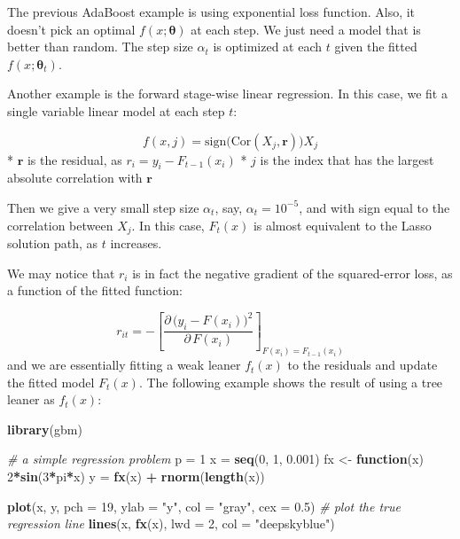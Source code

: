 \documentclass[
]{book}
\newenvironment{Shaded}{\begin{snugshade}}{\end{snugshade}}
\newcommand{\AttributeTok}[1]{\textcolor[rgb]{0.13,0.29,0.53}{#1}}
\newcommand{\CommentTok}[1]{\textcolor[rgb]{0.56,0.35,0.01}{\textit{#1}}}
\newcommand{\ControlFlowTok}[1]{\textcolor[rgb]{0.13,0.29,0.53}{\textbf{#1}}}
\newcommand{\DecValTok}[1]{\textcolor[rgb]{0.00,0.00,0.81}{#1}}
\newcommand{\FloatTok}[1]{\textcolor[rgb]{0.00,0.00,0.81}{#1}}
\newcommand{\FunctionTok}[1]{\textcolor[rgb]{0.13,0.29,0.53}{\textbf{#1}}}
\newcommand{\NormalTok}[1]{#1}
\newcommand{\OtherTok}[1]{\textcolor[rgb]{0.56,0.35,0.01}{#1}}
\newcommand{\SpecialCharTok}[1]{\textcolor[rgb]{0.81,0.36,0.00}{\textbf{#1}}}
\newcommand{\StringTok}[1]{\textcolor[rgb]{0.31,0.60,0.02}{#1}}
\theoremstyle{definition}
\theoremstyle{definition}
\theoremstyle{definition}
\theoremstyle{definition}
\theoremstyle{remark}
\begin{document}
The previous AdaBoost example is using exponential loss function. Also, it doesn't pick an optimal \(f(x; \boldsymbol \theta)\) at each step. We just need a model that is better than random. The step size \(\alpha_t\) is optimized at each \(t\) given the fitted \(f(x; \boldsymbol \theta_t)\).

Another example is the forward stage-wise linear regression. In this case, we fit a single variable linear model at each step \(t\):

\[f(x, j) = \text{sign}\big(\text{Cor}(X_j, \mathbf{r})\big) X_j\]
* \(\mathbf{r}\) is the residual, as \(r_i = y_i - F_{t-1}(x_i)\)
* \(j\) is the index that has the largest absolute correlation with \(\mathbf{r}\)

Then we give a very small step size \(\alpha_t\), say, \(\alpha_t = 10^{-5}\), and with sign equal to the correlation between \(X_j\). In this case, \(F_t(x)\) is almost equivalent to the Lasso solution path, as \(t\) increases.

We may notice that \(r_i\) is in fact the negative gradient of the squared-error loss, as a function of the fitted function:

\[r_{it} = - \left[ \frac{\partial \, \big(y_i - F(x_i)\big)^2 }{\partial \, F(x_i)} \right]_{F(x_i) = F_{t-1}(x_i)}\]
and we are essentially fitting a weak leaner \(f_t(x)\) to the residuals and update the fitted model \(F_t(x)\). The following example shows the result of using a tree leaner as \(f_t(x)\):

\begin{Shaded}
\begin{Highlighting}[]
  \FunctionTok{library}\NormalTok{(gbm)}

  \CommentTok{\# a simple regression problem}
\NormalTok{  p }\OtherTok{=} \DecValTok{1}
\NormalTok{  x }\OtherTok{=} \FunctionTok{seq}\NormalTok{(}\DecValTok{0}\NormalTok{, }\DecValTok{1}\NormalTok{, }\FloatTok{0.001}\NormalTok{)}
\NormalTok{  fx }\OtherTok{\textless{}{-}} \ControlFlowTok{function}\NormalTok{(x) }\DecValTok{2}\SpecialCharTok{*}\FunctionTok{sin}\NormalTok{(}\DecValTok{3}\SpecialCharTok{*}\NormalTok{pi}\SpecialCharTok{*}\NormalTok{x)}
\NormalTok{  y }\OtherTok{=} \FunctionTok{fx}\NormalTok{(x) }\SpecialCharTok{+} \FunctionTok{rnorm}\NormalTok{(}\FunctionTok{length}\NormalTok{(x))}

  \FunctionTok{plot}\NormalTok{(x, y, }\AttributeTok{pch =} \DecValTok{19}\NormalTok{, }\AttributeTok{ylab =} \StringTok{"y"}\NormalTok{, }\AttributeTok{col =} \StringTok{"gray"}\NormalTok{, }\AttributeTok{cex =} \FloatTok{0.5}\NormalTok{)}
  \CommentTok{\# plot the true regression line}
  \FunctionTok{lines}\NormalTok{(x, }\FunctionTok{fx}\NormalTok{(x), }\AttributeTok{lwd =} \DecValTok{2}\NormalTok{, }\AttributeTok{col =} \StringTok{"deepskyblue"}\NormalTok{)}
\end{Highlighting}
\end{Shaded}
\end{document}
